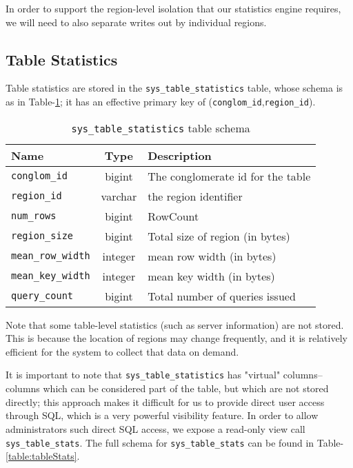 In order to support the region-level isolation that our statistics engine requires, we will need to also separate writes out by individual regions. 

\subsection{Table Statistics}
Table statistics are stored in the \texttt{sys\_table\_statistics} table, whose schema is as in Table-\ref{table:tableStatistics}; it has an effective primary key of (\texttt{conglom\_id},\texttt{region\_id}).

\begin{table}
				\begin{tabular}{|l|c|p{6cm}|}
								\hline
								\bf{Name}									& \bf{Type}	&	\bf{Description} \\ \hline	
								\texttt{conglom\_id}			&	bigint	&	The conglomerate id for the table \\ \hline
								\texttt{region\_id}				&	varchar	&	the region identifier \\ \hline
								\texttt{num\_rows}				&	bigint	& RowCount \\ \hline
								\texttt{region\_size}			&	bigint	&	Total size of region (in bytes) \\ \hline
								\texttt{mean\_row\_width}	&	integer	&	mean row width (in bytes) \\ \hline
								\texttt{mean\_key\_width}	&	integer	&	mean key width (in bytes) \\ \hline
								\texttt{query\_count}			&	bigint	&	Total number of queries issued \\ \hline
				\end{tabular}
				\caption{\texttt{sys\_table\_statistics} table schema}
				\label{table:tableStatistics}
\end{table}

Note that some table-level statistics (such as server information) are not stored. This is because the location of regions may change frequently, and it is relatively efficient for the system to collect that data on demand.

It is important to note that \texttt{sys\_table\_statistics} has "virtual" columns--columns which can be considered part of the table, but which are not stored directly; this approach makes it difficult for us to provide direct user access through SQL, which is a very powerful visibility feature. In order to allow administrators such direct SQL access, we expose a read-only view call \texttt{sys\_table\_stats}. The full schema for \texttt{sys\_table\_stats} can be found in Table-\ref{table:tableStats}.

